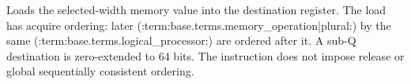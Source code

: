 Loads the selected-width memory value into the destination register. The load has acquire ordering: later
(:term:base.terms.memory_operation|plural:) by the same (:term:base.terms.logical_processor:) are ordered after it.
A sub-Q destination is zero-extended to 64 bits. The instruction does not impose release or global
sequentially consistent ordering.
